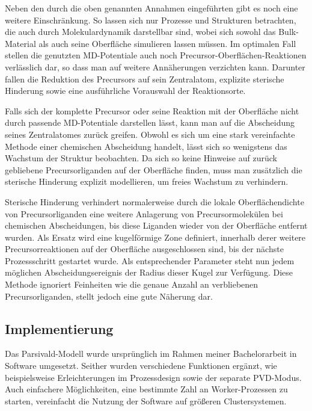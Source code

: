 Neben den durch die oben genannten Annahmen  eingeführten gibt es noch eine weitere Einschränkung.
So lassen sich nur Prozesse und Strukturen betrachten, die auch durch Molekulardynamik darstellbar sind, wobei sich sowohl das Bulk-Material als auch seine Oberfläche simulieren lassen müssen.
Im optimalen Fall stellen die genutzten MD-Potentiale auch noch Precursor-Oberflächen-Reaktionen verlässlich dar, so dass man auf weitere Annäherungen verzichten kann.
Darunter fallen die Reduktion des Precursors auf sein Zentralatom, explizite sterische Hinderung sowie eine ausführliche Vorauswahl der Reaktionsorte.

Falls sich der komplette Precursor oder seine Reaktion mit der Oberfläche nicht durch passende MD-Potentiale darstellen lässt, kann man auf die Abscheidung seines Zentralatomes zurück greifen.
Obwohl es sich um eine stark vereinfachte Methode einer chemischen Abscheidung handelt, lässt sich so wenigstens das Wachstum der Struktur beobachten.
Da sich so keine Hinweise auf zurück gebliebene Precursorliganden auf der Oberfläche finden, muss man zusätzlich die sterische Hinderung explizit modellieren, um freies Wachstum zu verhindern.


Sterische Hinderung verhindert normalerweise durch die lokale Oberflächendichte von Precursorliganden eine weitere Anlagerung von Precursormolekülen bei chemischen Abscheidungen, bis diese Liganden wieder von der Oberfläche entfernt wurden.
Als Ersatz wird eine kugelförmige Zone definiert, innerhalb derer weitere Precursorreaktionen auf der Oberfläche ausgeschlossen sind, bis der nächste Prozessschritt gestartet wurde.
Als entsprechender Parameter steht nun jedem möglichen Abscheidungsereignis der Radius dieser Kugel zur Verfügung.
Diese Methode ignoriert Feinheiten wie die genaue Anzahl an verbliebenen Precursorliganden, stellt jedoch eine gute Näherung dar.

\subsection{Implementierung}

Das Parsivald-Modell wurde ursprünglich im Rahmen meiner Bachelorarbeit  in Software umgesetzt.
Seither wurden verschiedene Funktionen ergänzt, wie beispielsweise Erleichterungen im Prozessdesign sowie der separate PVD-Modus.
Auch einfachere Möglichkeiten, eine bestimmte Zahl an Worker-Prozessen zu starten, vereinfacht die Nutzung der Software auf größeren Clustersystemen.

